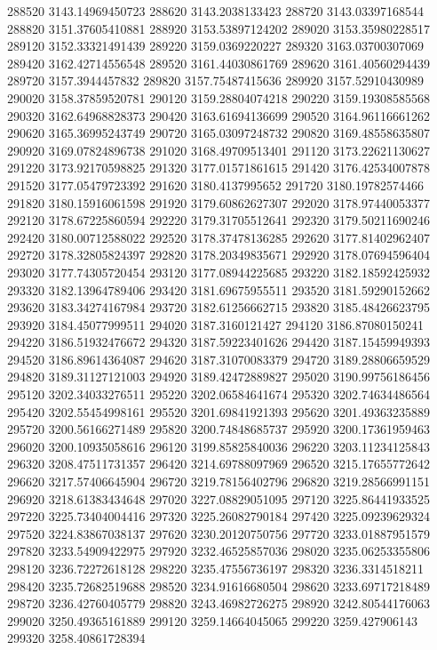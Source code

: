 {288520 3143.14969450723
288620 3143.2038133423
288720 3143.03397168544
288820 3151.37605410881
288920 3153.53897124202
289020 3153.35980228517
289120 3152.33321491439
289220 3159.0369220227
289320 3163.03700307069
289420 3162.42714556548
289520 3161.44030861769
289620 3161.40560294439
289720 3157.3944457832
289820 3157.75487415636
289920 3157.52910430989
290020 3158.37859520781
290120 3159.28804074218
290220 3159.19308585568
290320 3162.64968828373
290420 3163.61694136699
290520 3164.96116661262
290620 3165.36995243749
290720 3165.03097248732
290820 3169.48558635807
290920 3169.07824896738
291020 3168.49709513401
291120 3173.22621130627
291220 3173.92170598825
291320 3177.01571861615
291420 3176.42534007878
291520 3177.05479723392
291620 3180.4137995652
291720 3180.19782574466
291820 3180.15916061598
291920 3179.60862627307
292020 3178.97440053377
292120 3178.67225860594
292220 3179.31705512641
292320 3179.50211690246
292420 3180.00712588022
292520 3178.37478136285
292620 3177.81402962407
292720 3178.32805824397
292820 3178.20349835671
292920 3178.07694596404
293020 3177.74305720454
293120 3177.08944225685
293220 3182.18592425932
293320 3182.13964789406
293420 3181.69675955511
293520 3181.59290152662
293620 3183.34274167984
293720 3182.61256662715
293820 3185.48426623795
293920 3184.45077999511
294020 3187.3160121427
294120 3186.87080150241
294220 3186.51932476672
294320 3187.59223401626
294420 3187.15459949393
294520 3186.89614364087
294620 3187.31070083379
294720 3189.28806659529
294820 3189.31127121003
294920 3189.42472889827
295020 3190.99756186456
295120 3202.34033276511
295220 3202.06584641674
295320 3202.74634486564
295420 3202.55454998161
295520 3201.69841921393
295620 3201.49363235889
295720 3200.56166271489
295820 3200.74848685737
295920 3200.17361959463
296020 3200.10935058616
296120 3199.85825840036
296220 3203.11234125843
296320 3208.47511731357
296420 3214.69788097969
296520 3215.17655772642
296620 3217.57406645904
296720 3219.78156402796
296820 3219.28566991151
296920 3218.61383434648
297020 3227.08829051095
297120 3225.86441933525
297220 3225.73404004416
297320 3225.26082790184
297420 3225.09239629324
297520 3224.83867038137
297620 3230.20120750756
297720 3233.01887951579
297820 3233.54909422975
297920 3232.46525857036
298020 3235.06253355806
298120 3236.72272618128
298220 3235.47556736197
298320 3236.3314518211
298420 3235.72682519688
298520 3234.91616680504
298620 3233.69717218489
298720 3236.42760405779
298820 3243.46982726275
298920 3242.80544176063
299020 3250.49365161889
299120 3259.14664045065
299220 3259.427906143
299320 3258.40861728394
}
